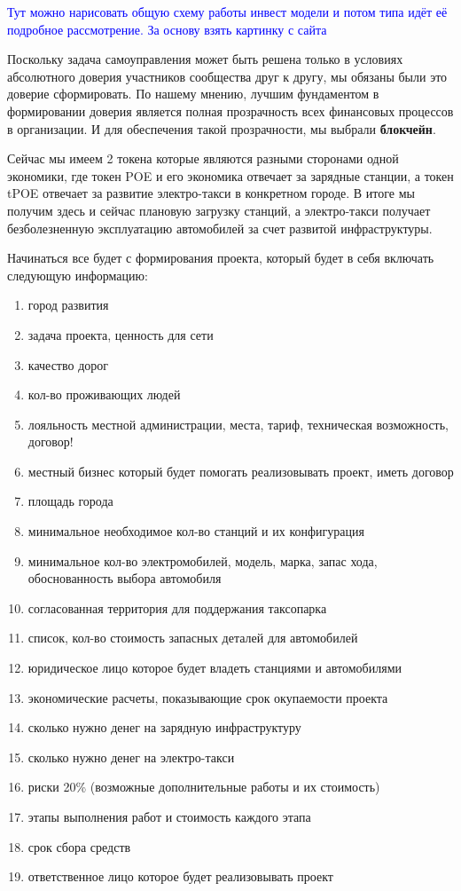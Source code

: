 \documentclass[a4paper,12pt]{report}
\begin{document}
\textcolor{blue}{Тут можно нарисовать общую схему работы инвест модели и потом типа идёт её подробное рассмотрение. За основу взять картинку с сайта}

Поскольку задача самоуправления  может быть решена только в условиях абсолютного доверия участников сообщества друг к другу, мы обязаны были это доверие сформировать. По нашему мнению, лучшим фундаментом в формировании доверия является полная прозрачность всех финансовых процессов в организации. И для обеспечения такой прозрачности, мы выбрали \textbf{блокчейн}. 

Сейчас мы имеем 2 токена которые являются разными сторонами одной экономики, где
токен POE и его экономика отвечает за зарядные станции, а токен tPOE отвечает за развитие электро-такси в конкретном городе. В итоге мы получим здесь и сейчас плановую загрузку станций, а электро-такси получает безболезненную эксплуатацию автомобилей за счет развитой инфраструктуры. 

Начинаться все будет с формирования проекта, который будет в себя включать следующую информацию:

\begin{enumerate}
	
	\item город развития
	\item задача проекта, ценность для сети
	\item качество дорог
	\item кол-во проживающих людей 
	\item лояльность местной администрации, места, тариф, техническая возможность, договор!
	\item местный бизнес который будет помогать реализовывать проект, иметь договор
	\item площадь города
	\item минимальное необходимое кол-во станций и их конфигурация
	\item минимальное кол-во электромобилей, модель, марка, запас хода, обоснованность выбора автомобиля
	\item согласованная территория для поддержания таксопарка
	\item список, кол-во стоимость запасных деталей для автомобилей
	\item юридическое лицо которое будет владеть станциями и автомобилями
	\item экономические расчеты, показывающие срок окупаемости проекта 
	\item сколько нужно денег на зарядную инфраструктуру
	\item сколько нужно денег на электро-такси
	\item риски 20\% (возможные дополнительные работы и их стоимость)
	\item этапы выполнения работ и стоимость каждого этапа
	\item срок сбора средств
	\item ответственное лицо которое будет реализовывать проект

\end{enumerate}
 
\end{document}
